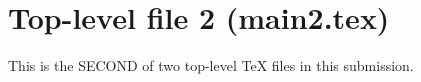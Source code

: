 \documentclass{article}
\begin{document}
\section*{Top-level file 2 (main2.tex)}
This is the SECOND of two top-level TeX files in this submission.
\end{document}
